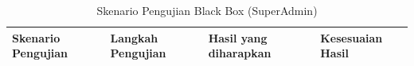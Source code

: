 \begin{longtable}{|p{3.8cm}|p{4.5cm}|p{4.5cm}|p{2cm}|} %
    \caption{Skenario Pengujian Black Box (SuperAdmin) } \label{tabel:rancangan_bb_superadmin}                                                                                                                                                                                                                                                                                                                                                                                                                                          \\
    \hline
    \textbf{Skenario Pengujian}                                    & \textbf{Langkah Pengujian}                                                                                                                                                                                                                                             & \textbf{Hasil yang diharapkan}                                                                                                                                & \textbf{Kesesuaian Hasil} \\
    \hline
    \endfirsthead




\end{longtable}
